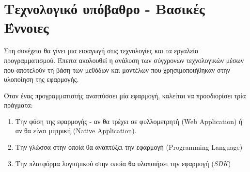 \section{Τεχνολογικό υπόβαθρο - Βασικές Έννοιες}
Στη συνέχεια θα γίνει μια εισαγωγή στις τεχνολογίες και τα εργαλεία προγραμματισμού. Έπειτα ακολουθεί η ανάλυση των σύγχρονων τεχνολογικών μέσων που αποτελούν τη βάση των μεθόδων και μοντέλων που χρησιμοποιήθηκαν στην υλοποίηση της εφαρμογής. 

Όταν ένας προγραμματιστής αναπτύσσει μία εφαρμογή, καλείται να προσδιορίσει τρία πράγματα:
\begin{enumerate}
\item Tην φύση της εφαρμογής - αν θα τρέχει σε φυλλομετρητή (Web Application) ή αν θα είναι μητρική (Native Application).
\item Την γλώσσα στην οποία θα αναπτύξει την εφαρμογή (Programming Language)
\item Την πλατφόρμα λογισμικού στην οποία θα υλοποιήσει την εφαρμογή (\textit{SDK})
\end{enumerate}

